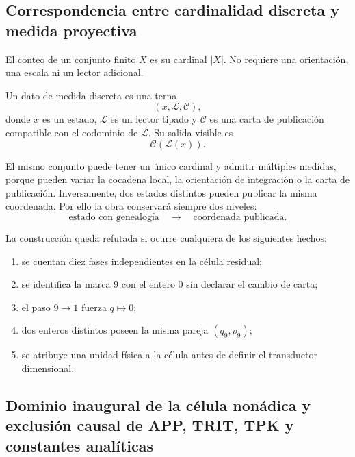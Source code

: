 \subsection{Correspondencia entre cardinalidad discreta y medida proyectiva}

\begin{definition}[Conteo]
El conteo de un conjunto finito \(X\) es su cardinal \(|X|\). No requiere
una orientación, una escala ni un lector adicional.
\end{definition}

\begin{definition}
Un dato de medida discreta es una terna
\[
 (x,\mathcal L,\mathcal C),
\]
donde \(x\) es un estado, \(\mathcal L\) es un lector tipado y
\(\mathcal C\) es una carta de publicación compatible con el codominio de
\(\mathcal L\). Su salida visible es
\[
 \mathcal C(\mathcal L(x)).
\]
\end{definition}

El mismo conjunto puede tener un único cardinal y admitir múltiples medidas,
porque pueden variar la cocadena local, la orientación de integración o la
carta de publicación. Inversamente, dos estados distintos pueden publicar la
misma coordenada. Por ello la obra conservará siempre dos niveles:
\[
 \text{estado con genealogía}
 \quad\longrightarrow\quad
 \text{coordenada publicada}.
\]

\begin{criterion}
La construcción queda refutada si ocurre cualquiera de los siguientes
hechos:
\begin{enumerate}
 \item se cuentan diez fases independientes en la célula residual;
 \item se identifica la marca \(9\) con el entero \(0\) sin declarar el
 cambio de carta;
 \item el paso \(9\to1\) fuerza \(q\mapsto0\);
 \item dos enteros distintos poseen la misma pareja \((q_9,\rho_9)\);
 \item se atribuye una unidad física a la célula antes de definir el
 transductor dimensional.
\end{enumerate}
\end{criterion}

\subsection{Dominio inaugural de la célula nonádica y exclusión causal de APP, TRIT, TPK y constantes analíticas}

